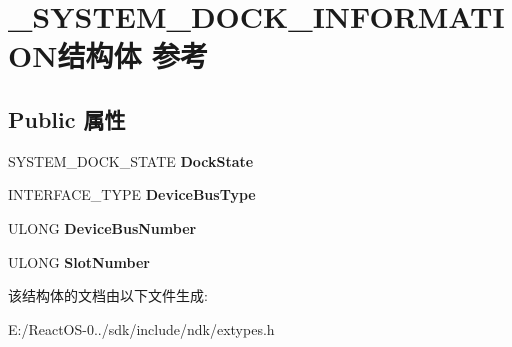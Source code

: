 \hypertarget{struct___s_y_s_t_e_m___d_o_c_k___i_n_f_o_r_m_a_t_i_o_n}{}\section{\+\_\+\+S\+Y\+S\+T\+E\+M\+\_\+\+D\+O\+C\+K\+\_\+\+I\+N\+F\+O\+R\+M\+A\+T\+I\+O\+N结构体 参考}
\label{struct___s_y_s_t_e_m___d_o_c_k___i_n_f_o_r_m_a_t_i_o_n}
\subsection*{Public 属性}
\begin{DoxyCompactItemize}
\item 
\mbox{\label{struct___s_y_s_t_e_m___d_o_c_k___i_n_f_o_r_m_a_t_i_o_n_a4d446c85b4ca90410826aebad265e3da}} 
S\+Y\+S\+T\+E\+M\+\_\+\+D\+O\+C\+K\+\_\+\+S\+T\+A\+TE {\bfseries Dock\+State}
\item 
\mbox{\label{struct___s_y_s_t_e_m___d_o_c_k___i_n_f_o_r_m_a_t_i_o_n_a8bb68cc8efdac7a3705c12635bc3b077}} 
I\+N\+T\+E\+R\+F\+A\+C\+E\+\_\+\+T\+Y\+PE {\bfseries Device\+Bus\+Type}
\item 
\mbox{\label{struct___s_y_s_t_e_m___d_o_c_k___i_n_f_o_r_m_a_t_i_o_n_a9a899a5186485103fc9855e446a6a33b}} 
U\+L\+O\+NG {\bfseries Device\+Bus\+Number}
\item 
\mbox{\label{struct___s_y_s_t_e_m___d_o_c_k___i_n_f_o_r_m_a_t_i_o_n_aad74250cdb8fea26524b63f6dc07ad46}} 
U\+L\+O\+NG {\bfseries Slot\+Number}
\end{DoxyCompactItemize}


该结构体的文档由以下文件生成\+:\begin{DoxyCompactItemize}
\item 
E\+:/\+React\+O\+S-\/0../sdk/include/ndk/extypes.\+h\end{DoxyCompactItemize}
